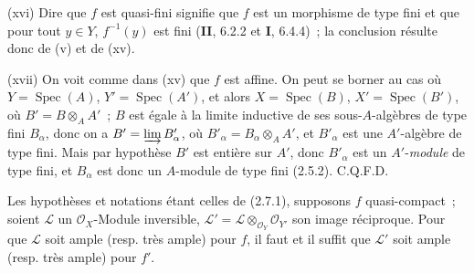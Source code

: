 (xvi) Dire que $f$ est quasi-fini signifie que $f$ est un morphisme de
type fini et que pour tout $y\in Y$, $f^{-1}(y)$ est fini (\textbf{II}, 6.2.2 et \textbf{I},
6.4.4)~; la conclusion résulte donc de (v) et de (xv).

(xvii) On voit comme dans (xv) que $f$ est affine. On peut se borner
au cas où $Y=\operatorname{Spec}(A)$, $Y'=\operatorname{Spec}(A')$, et alors
$X=\operatorname{Spec}(B)$, $X'=\operatorname{Spec}(B')$, où
$B'=B\otimes_A A'$~; $B$ est égale à la limite inductive de ses
sous-$A$-algèbres de type fini $B_\alpha$, donc on a
$B'=\varinjlim B'_\alpha$, où $B'_\alpha=B_\alpha\otimes_A A'$, et
$B'_\alpha$ est une $A'$-algèbre de type fini. Mais par hypothèse $B'$ est
entière sur $A'$, donc $B'_\alpha$ est un $A'$-\emph{module} de type fini, et
$B_\alpha$ est donc un $A$-module de type fini (2.5.2). C.Q.F.D.

\begin{corollary}[2.7.2]
\label{IV.2.7.2-fr}
Les hypothèses et notations étant celles de \textup{(2.7.1)}, supposons $f$
quasi-compact~; soient $\mathcal L$ un $\mathcal O_X$-Module inversible,
$\mathcal L'=\mathcal L\otimes_{\mathcal O_Y}\mathcal O_{Y'}$ son image
réciproque. Pour que $\mathcal L$ soit ample \textup{(resp.} très ample\textup{)} pour $f$, il
faut et il suffit que $\mathcal L'$ soit ample \textup{(resp.} très ample\textup{)} pour $f'$.
\end{corollary}

